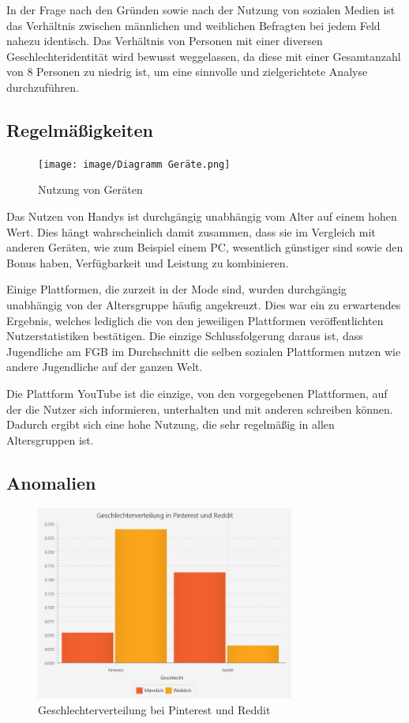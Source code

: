 In der Frage nach den Gründen sowie nach der Nutzung von sozialen Medien ist das Verhältnis zwischen männlichen und weiblichen Befragten
bei jedem Feld nahezu identisch. Das Verhältnis von Personen mit einer diversen Geschlechteridentität wird bewusst weggelassen, da
diese mit einer Gesamtanzahl von 8 Personen zu niedrig ist, um eine sinnvolle und zielgerichtete Analyse durchzuführen.

\subsection{Regelmäßigkeiten}

\begin{figure}[h]
    \centering
    \texttt{[image: image/Diagramm Geräte.png]}
    \caption{\label{imgs:diagramm_geraete_regelmaesigkeit}Nutzung von Geräten}
\end{figure}

Das Nutzen von Handys ist durchgängig unabhängig vom Alter auf einem hohen Wert. Dies hängt wahrscheinlich damit zusammen, dass
sie im Vergleich mit anderen Geräten, wie zum Beispiel einem PC, wesentlich günstiger sind sowie den Bonus haben, Verfügbarkeit und
Leistung zu kombinieren.

Einige Plattformen, die zurzeit in der Mode sind, wurden durchgängig unabhängig von der Altersgruppe häufig angekreuzt. Dies war ein 
zu erwartendes Ergebnis, welches lediglich die von den jeweiligen  Plattformen veröffentlichten Nutzerstatistiken bestätigen. Die
einzige Schlussfolgerung daraus ist, dass Jugendliche am FGB im Durchschnitt die selben sozialen Plattformen nutzen wie 
andere Jugendliche auf der ganzen Welt.

Die Plattform YouTube ist die einzige, von den vorgegebenen Plattformen, auf der die Nutzer sich informieren, unterhalten und mit 
anderen schreiben können. Dadurch ergibt sich eine hohe Nutzung, die sehr regelmäßig in allen Altersgruppen ist.

\subsection{Anomalien}

\begin{figure}[h]
    \centering
    \includegraphics[width=8.5cm]{image/Diagramm Pinterst vs Reddit.png}
    \caption{\label{imgs:diagramm_pinterest_reddit}Geschlechterverteilung bei Pinterest und Reddit}
\end{figure}

